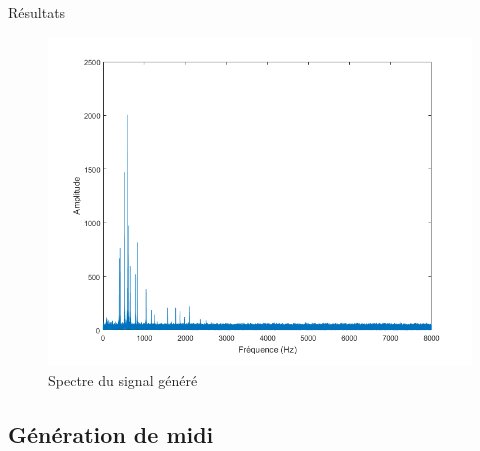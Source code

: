 \documentclass{beamer}
\begin{document}
\begin{frame}{Résultats}
\begin{figure}
\begin{center}
\includegraphics[scale=0.4]{images/spectre.png}
\caption{Spectre du signal généré}
\end{center}
\end{figure}
\end{frame}

\subsection{Génération de midi}
\end{document}
